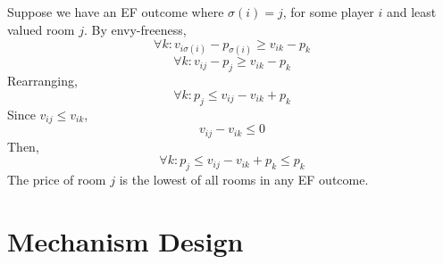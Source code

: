 \subsection{}
Suppose we have an EF outcome where $\sigma(i)=j$,
for some player $i$ and least valued room $j$.
By envy-freeness,
\[\forall k: v_{i\sigma(i)}-p_{\sigma(i)} \geq v_{ik} - p_k\]
\[\forall k: v_{ij}-p_{j} \geq v_{ik} - p_k\]
Rearranging,
\[\forall k: p_{j} \leq v_{ij}-v_{ik} + p_k\]
Since $v_{ij}\leq v_{ik}$,
\[v_{ij} - v_{ik} \leq 0\]
Then,
\[\forall k: p_{j} \leq v_{ij}-v_{ik} + p_k \leq p_k\]
The price of room $j$ is the lowest of all rooms in any EF outcome.

\newpage
\section{Mechanism Design}

\subsection{}
